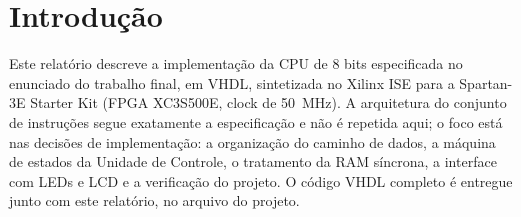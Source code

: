 \section{Introdução}
\label{sec:intro}

Este relatório descreve a implementação da CPU de 8 bits especificada no
enunciado do trabalho final, em VHDL, sintetizada no Xilinx ISE para a
Spartan-3E Starter Kit (FPGA XC3S500E, clock de \SI{50}{\mega\hertz}). A
arquitetura do conjunto de instruções segue exatamente a especificação e não é
repetida aqui; o foco está nas decisões de implementação: a organização do
caminho de dados, a máquina de estados da Unidade de Controle, o tratamento da
RAM síncrona, a interface com LEDs e LCD e a verificação do projeto. O código
VHDL completo é entregue junto com este relatório, no arquivo do projeto.
